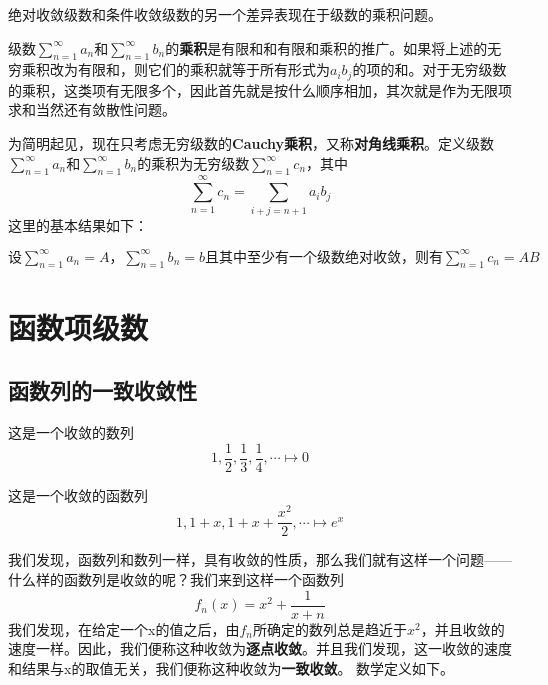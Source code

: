 \documentclass[lang=cn,10pt]{elegantbook}
\begin{document}
绝对收敛级数和条件收敛级数的另一个差异表现在于级数的乘积问题。

级数$\sum_{n=1}^{\infty}{a_n}\text{和}\sum_{n=1}^{\infty}{b_n}$的\textbf{乘积}是有限和和有限和乘积的推广。如果将上述的无穷乘积改为有限和，则它们的乘积就等于所有形式为$a_{i}b_{j}$的项的和。对于无穷级数的乘积，这类项有无限多个，因此首先就是按什么顺序相加，其次就是作为无限项求和当然还有敛散性问题。

为简明起见，现在只考虑无穷级数的\textbf{Cauchy乘积}，又称\textbf{对角线乘积}。定义级数$\sum_{n=1}^{\infty}{a_n}\text{和}\sum_{n=1}^{\infty}{b_n}$的乘积为无穷级数$\sum_{n=1}^{\infty}{c_n}$，其中
\begin{equation*}
	\sum_{n=1}^{\infty}{c_n}=\sum_{i+j=n+1}^{}{a_ib_j}
\end{equation*}
这里的基本结果如下：
\begin{proposition}[Mertens定理]
	$\text{设}\sum_{n=1}^{\infty}{a_n}=A\text{，}\sum_{n=1}^{\infty}{b_n=b}\text{且其中至少有一个级数绝对收敛，则有}\sum_{n=1}^{\infty}{c_n}=AB$
\end{proposition}
\section{函数项级数}
\subsection{函数列的一致收敛性}
这是一个收敛的数列
\begin{equation*}
	1,\frac{1}{2},\frac{1}{3},\frac{1}{4},\cdots \longmapsto 0
\end{equation*}

这是一个收敛的函数列
\begin{equation*}
	1,1+x,1+x+\frac{x^{2}}{2},\cdots \longmapsto e^{x}
\end{equation*}

我们发现，函数列和数列一样，具有收敛的性质，那么我们就有这样一个问题——什么样的函数列是收敛的呢？我们来到这样一个函数列
\begin{equation*}
	f_{n}(x)=x^{2}+\frac{1}{x+n}
\end{equation*}
我们发现，在给定一个x的值之后，由$f_{n}$所确定的数列总是趋近于$x^{2}$，并且收敛的速度一样。因此，我们便称这种收敛为\textbf{逐点收敛}。并且我们发现，这一收敛的速度和结果与x的取值无关，我们便称这种收敛为\textbf{一致收敛}。
数学定义如下。~\\
~\\
~\\
\end{document}
